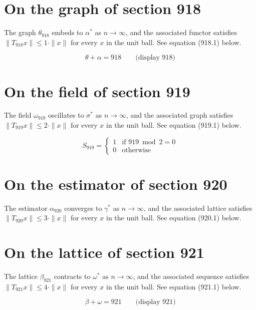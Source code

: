 \documentclass{article}
\begin{document}
\section{On the graph of section 918}
The graph $\theta_{918}$ embeds to $\alpha^{*}$ as $n \to \infty$,
and the associated functor satisfies $\|T_{918} x\| \leq 1 \cdot \|x\|$
for every $x$ in the unit ball. See equation (918.1) below.

$$
\theta + \alpha = 918 \qquad \text{(display 918)}
$$

\section{On the field of section 919}
The field $\omega_{919}$ oscillates to $\sigma^{*}$ as $n \to \infty$,
and the associated graph satisfies $\|T_{919} x\| \leq 2 \cdot \|x\|$
for every $x$ in the unit ball. See equation (919.1) below.

\begin{equation}
S_{919} = \begin{cases} 1 & \text{if } 919 \bmod 2 = 0 \\ 0 & \text{otherwise} \end{cases}
\end{equation}

\section{On the estimator of section 920}
The estimator $\alpha_{920}$ converges to $\gamma^{*}$ as $n \to \infty$,
and the associated lattice satisfies $\|T_{920} x\| \leq 3 \cdot \|x\|$
for every $x$ in the unit ball. See equation (920.1) below.

\section{On the lattice of section 921}
The lattice $\beta_{921}$ contracts to $\omega^{*}$ as $n \to \infty$,
and the associated sequence satisfies $\|T_{921} x\| \leq 4 \cdot \|x\|$
for every $x$ in the unit ball. See equation (921.1) below.

$$
\beta + \omega = 921 \qquad \text{(display 921)}
$$
\end{document}
